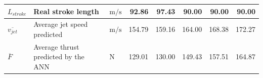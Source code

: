 \begin{landscape}
\begin{table}
\begin{tabular}{lllrrrrr}
                        $L_{stroke}$         & Real stroke length                        & $\mathrm{m/s}$ & 92.86  & 97.43  & 90.00  & 90.00  & 90.00 \\
                        \hline
                        $\overline{v_{jet}}$ & Average jet speed predicted               & $\mathrm{m/s}$ & 154.79         & 159.16         & 164.00         & 168.38         & 172.27         \\
                        $\overline{F}$       & Average thrust predicted by the ANN & $\mathrm{N}$   & 129.01         & 130.00         & 149.43         & 157.51         & 164.87        \\

                        \hline
                    \end{tabular}
                \end{table}
            \end{landscape}
            

